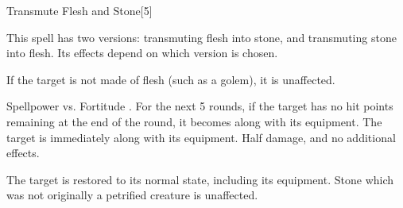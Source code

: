 \begin{spellsection}{Transmute Flesh and Stone}[5]
    \begin{spellheader}
    \end{spellheader}
    \begin{spellcontent}
        \begin{spelltargetinginfo}
            \spellspecial This spell has two versions: transmuting flesh into stone, and transmuting stone into flesh. Its effects depend on which version is chosen.
        \end{spelltargetinginfo}
    \end{spellcontent}
    \begin{spellsubcontent}
        \begin{spelltargetinginfo}
        \end{spelltargetinginfo}
        \begin{spelleffects}
            \spellspecial If the target is not made of flesh (such as a golem), it is unaffected.
            \begin{spellattack}{Spellpower vs. Fortitude}
                \spellsuccess {}. For the next 5 rounds, if the target has no hit points remaining at the end of the round, it becomes \petrified along with its equipment.
                \spellcritical The target is immediately \petrified along with its equipment.
                \spellfailure Half damage, and no additional effects.
            \end{spellattack}
        \end{spelleffects}
    \end{spellsubcontent}
    \begin{spellsubcontent}
        \begin{spelltargetinginfo}
        \end{spelltargetinginfo}
        \begin{spelleffects}
            \spelleffect The target is restored to its normal state, including its equipment. Stone which was not originally a petrified creature is unaffected.
        \end{spelleffects}
    \end{spellsubcontent}
    \begin{spellfooter}
        \miscastrandom
    \end{spellfooter}
\end{spellsection}

